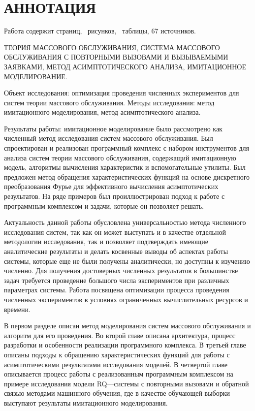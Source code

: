 \section*{\normalsize\centering АННОТАЦИЯ}
Работа содержит \pageref{LastPage} страниц, \totalfigures\ рисунков, \totaltables\ таблицы, 67 источников.
 
ТЕОРИЯ МАССОВОГО ОБСЛУЖИВАНИЯ, СИСТЕМА МАССОВОГО ОБСЛУЖИВАНИЯ С ПОВТОРНЫМИ ВЫЗОВАМИ И ВЫЗЫВАЕМЫМИ ЗАЯВКАМИ, МЕТОД АСИМПТОТИЧЕСКОГО АНАЛИЗА, ИМИТАЦИОННОЕ МОДЕЛИРОВАНИЕ.

Объект исследования: оптимизация проведения численных экспериментов для систем теории массового обслуживания.
Методы исследования: метод имитационного моделирования, метод асимптотического анализа. 

Результаты работы: имитационное моделирование было рассмотрено как численный метод исследования систем массового обслуживания. Был спроектирован и реализован программный комплекс с набором инструментов для анализа систем теории массового обслуживания, содержащий имитационную модель, алгоритмы вычисления характеристик и вспомогательные утилиты. Был предложен метод обращения характеристических функций на основе дискретного преобразования Фурье для эффективного вычисления асимптотических результатов. На ряде примеров был проиллюстрирован подход к работе с программным комплексом и задачи, которые он позволяет решать.

Актуальность данной работы обусловлена универсальностью метода численного исследования систем, так как он может выступать и в качестве  отдельной методологии исследования, так и позволяет подтверждать имеющие аналитические результаты и делать косвенные выводы об аспектах работы системы, которые еще не были получены аналитически, но доступны к изучению численно. Для получения достоверных численных результатов в большинстве задач требуется проведение большого числа экспериментов при различных параметрах системы. Работа посвящена оптимизации процесса проведения численных экспериментов в условиях ограниченных вычислительных ресурсов и времени.

В первом разделе описан метод моделирования систем массового обслуживания и алгоритм для его проведения. Во второй главе описана архитектура, процесс разработки и особенности реализации программного комплекса. В третьей главе описаны подходы к обращению характеристических функций для работы с асимптотическими результатами исследования моделей. В четвертой главе описывается процесс работы с реализованным программным комплексом на примере исследования модели RQ---системы с повторными вызовами и обратной связью методами машинного обучения, где в качестве обучающей выборки выступают результаты имитационного моделирования.

\thispagestyle{empty}\addtocounter{page}{-1} %
\clearpage